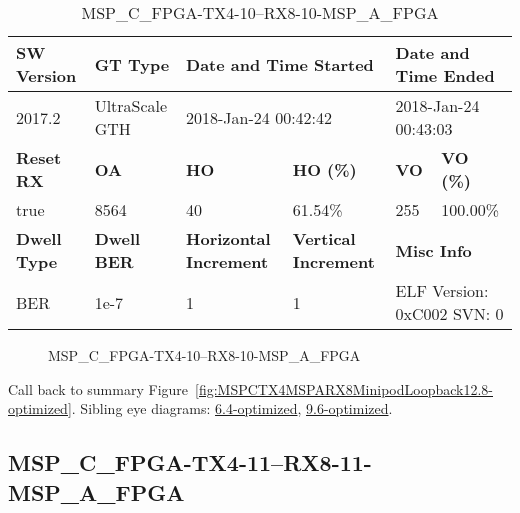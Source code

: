 \begin{table}[h]
\centering
\caption{MSP\_C\_FPGA-TX4-10--RX8-10-MSP\_A\_FPGA}
\label{tab:MSPCFPGATX410RX810MSPAFPGA12.8-optimized}
\begin{tabular}{@{}|l|l|l|l|l|l|@{}}
\toprule
\textbf{SW Version}                & \textbf{GT Type}   & \multicolumn{2}{l|}{\textbf{Date and Time Started}}            & \multicolumn{2}{l|}{\textbf{Date and Time Ended}}        \\ \midrule
2017.2                       & UltraScale GTH          & \multicolumn{2}{l|}{2018-Jan-24 00:42:42}                   & \multicolumn{2}{l|}{2018-Jan-24 00:43:03}               \\ \midrule
\textbf{Reset RX}                  & \textbf{OA} & \textbf{HO}   & \textbf{HO (\%)} & \textbf{VO} & \textbf{VO (\%)} \\ \midrule
true & 8564        & 40          & 61.54\%        & 255        & 100.00\%       \\ \midrule
\textbf{Dwell Type}                & \textbf{Dwell BER} & \textbf{Horizontal Increment} & \textbf{Vertical Increment}    & \multicolumn{2}{l|}{\textbf{Misc Info}}                  \\ \midrule
BER                            & 1e-7        & 1        & 1           & \multicolumn{2}{l|}{ELF Version: 0xC002 SVN: 0}                         \\ \bottomrule
\end{tabular}
\end{table}

\begin{figure}[h]
\caption{MSP\_C\_FPGA-TX4-10--RX8-10-MSP\_A\_FPGA} \label{fig:MSPCFPGATX410RX810MSPAFPGA12.8-optimized}
\end{figure}

Call back to summary Figure~\ref{fig:MSPCTX4MSPARX8MinipodLoopback12.8-optimized}.
Sibling eye diagrams: \hyperref[sec:MSPCFPGATX410RX810MSPAFPGA6.4-optimized]{6.4-optimized}, \hyperref[sec:MSPCFPGATX410RX810MSPAFPGA9.6-optimized]{9.6-optimized}.

\clearpage
\newpage


\subsection{MSP\_C\_FPGA-TX4-11--RX8-11-MSP\_A\_FPGA}\label{sec:MSPCFPGATX411RX811MSPAFPGA12.8-optimized}

